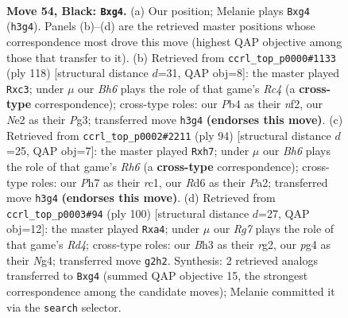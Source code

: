 \documentclass[11pt]{article}
\begin{document}
\clearpage

\begin{figure}[p]\centering
\begin{subfigure}{0.46\textwidth}\centering
\resizebox{\linewidth}{!}{%
\newchessgame
\chessboard[
  setfen={8/7p/3r1k2/4p3/1p4P1/4K2b/4n1r1/8 b - - 3 54},
  showmover=false,
  pgfstyle=straightmove, color=movearrow, markmove={h3-g4}
]}
\caption{}
\end{subfigure}\hfill
\begin{subfigure}{0.46\textwidth}\centering
\resizebox{\linewidth}{!}{%
\newchessgame
\chessboard[
  setfen={8/1k5p/8/3K4/PNR3p1/2p3P1/5n2/4r3 w - - 0 60},
  showmover=false,
  pgfstyle=straightmove, color=movearrow, markmove={c4-c3}
]}
\caption{}
\end{subfigure}
\\[4pt]
\begin{subfigure}{0.46\textwidth}\centering
\resizebox{\linewidth}{!}{%
\newchessgame
\chessboard[
  setfen={2k5/p6p/2P4R/7K/8/8/P7/2r5 w - - 3 48},
  showmover=false,
  pgfstyle=straightmove, color=movearrow, markmove={h6-h7}
]}
\caption{}
\end{subfigure}\hfill
\begin{subfigure}{0.46\textwidth}\centering
\resizebox{\linewidth}{!}{%
\newchessgame
\chessboard[
  setfen={8/1b4k1/3p2P1/8/p2R2N1/P3K3/6r1/8 w - - 0 51},
  showmover=false,
  pgfstyle=straightmove, color=movearrow, markmove={d4-a4}
]}
\caption{}
\end{subfigure}
\caption{\textbf{Move 54, Black: \texttt{Bxg4}.} (a) Our position; Melanie plays \texttt{Bxg4} (\texttt{h3g4}). Panels (b)--(d) are the retrieved master positions whose correspondence most drove this move (highest QAP objective among those that transfer to it). (b) Retrieved from \texttt{ccrl\_top\_p0000\#1133} (ply 118) [structural distance $d$=31, QAP obj=8]: the master played \texttt{Rxc3}; under $\mu$ our \emph{Bh6} plays the role of that game's \emph{Rc4} (a \textbf{cross-type} correspondence); cross-type roles: our \emph{P}b4 as their \emph{n}f2, our \emph{N}e2 as their \emph{P}g3; transferred move \texttt{h3g4} \textbf{(endorses this move)}. (c) Retrieved from \texttt{ccrl\_top\_p0002\#2211} (ply 94) [structural distance $d$=25, QAP obj=7]: the master played \texttt{Rxh7}; under $\mu$ our \emph{Bh6} plays the role of that game's \emph{Rh6} (a \textbf{cross-type} correspondence); cross-type roles: our \emph{P}h7 as their \emph{r}c1, our \emph{R}d6 as their \emph{P}a2; transferred move \texttt{h3g4} \textbf{(endorses this move)}. (d) Retrieved from \texttt{ccrl\_top\_p0003\#94} (ply 100) [structural distance $d$=27, QAP obj=12]: the master played \texttt{Rxa4}; under $\mu$ our \emph{Rg7} plays the role of that game's \emph{Rd4}; cross-type roles: our \emph{B}h3 as their \emph{r}g2, our \emph{p}g4 as their \emph{N}g4; transferred move \texttt{g2h2}. Synthesis: 2 retrieved analogs transferred to \texttt{Bxg4} (summed QAP objective 15, the strongest correspondence among the candidate moves); Melanie committed it via the \texttt{search} selector.}
\label{fig:thought-m107}
\end{figure}
\end{document}
